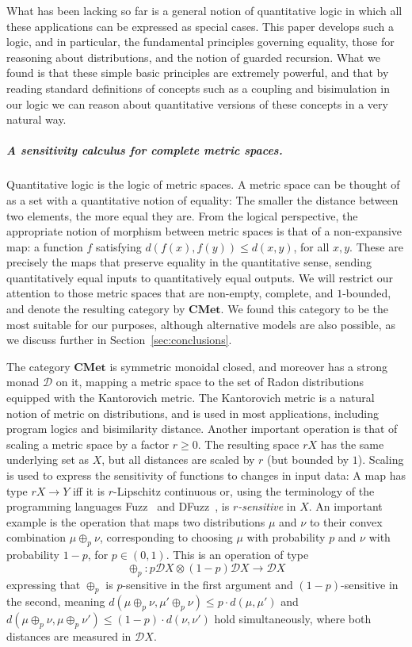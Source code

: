 \documentclass[a4paper,UKenglish,cleveref, autoref, thm-restate]{lipics-v2021}
\newcommand{\cat}[1]{\mathbf{#1}}
\newcommand{\CMet}{\cat{CMet}}
\newcommand{\mprod}{\otimes}
\newcommand{\D}{\mathcal{D}}
\newcommand{\sminus}{\!-\!}
\newcommand{\TD}{\mathcal{D}}
\begin{document}
What has been lacking so far is a general notion of quantitative logic in which all these applications can be expressed
as special cases. This paper develops such a logic, and in particular, the fundamental principles 
governing equality, those for reasoning about distributions, and the notion of guarded recursion. 
What we found is that these 
simple basic principles are extremely powerful, and that by reading standard definitions of concepts such as a coupling and
bisimulation in our logic we can reason about quantitative versions of these concepts in a very natural way. 


\subparagraph*{A sensitivity calculus for complete metric spaces.}

Quantitative logic is the logic of metric spaces.
A metric space can be thought of as a set with
a quantitative notion of equality: The smaller the distance between two elements, the more equal they are. From the
logical perspective, the appropriate notion of morphism between metric spaces is that of a non-expansive map: a function $f$ satisfying $d(f(x),f(y)) \leq d(x,y)$, for
all $x, y$. These are precisely the maps that preserve equality in the quantitative sense, sending quantitatively equal inputs to quantitatively equal outputs.
We will restrict our attention to those metric spaces that are non-empty, complete, and $1$-bounded, and denote the resulting category by $\CMet$. 
We found this category to be the most suitable for our purposes, although alternative models are also possible, as we discuss further in Section~\ref{sec:conclusions}.

The category $\CMet$ is symmetric monoidal closed, and moreover has a strong monad $\TD$ on it, mapping a metric
space to the set of Radon distributions equipped with the Kantorovich metric. The Kantorovich metric is a natural notion
of metric on distributions, and is used in most applications, including program logics and bisimilarity distance. 
Another important operation is that of scaling a metric space by a factor $r \geq 0$. The resulting space $r X$ has the same
underlying set as $X$, but all distances are scaled by $r$ (but bounded by $1$). 
Scaling is used to express the sensitivity of functions to changes in input data: A map has type $r X \to Y$ iff it is $r$-Lipschitz continuous or, using the terminology of the programming languages Fuzz~\cite{ReedP10} and DFuzz~\cite{GaboardiHHNP13}, is \emph{$r$-sensitive} in $X$.
An important example is the operation that maps two distributions $\mu$ and $\nu$ to their convex combination $\mu \oplus_p \nu$, corresponding to choosing $\mu$ with probability $p$ and $\nu$ with probability $1\sminus p$, for $p \in (0,1)$. This is an operation of type
\begin{equation} \label{eq:oplus:type}
\oplus_p \colon p\D X \mprod (1-p) \D X \to \D X
\end{equation}
expressing that $\oplus_p$ is $p$-sensitive in the first argument and $(1-p)$-sensitive in the second,
meaning $d(\mu\oplus_p\nu, \mu'\oplus_p \nu) \leq p\cdot d(\mu, \mu')$ and $d(\mu\oplus_p\nu, \mu\oplus_p \nu') \leq (1-p)\cdot d(\nu, \nu')$ hold simultaneously, where both distances are measured in $\D X$.
\end{document}
